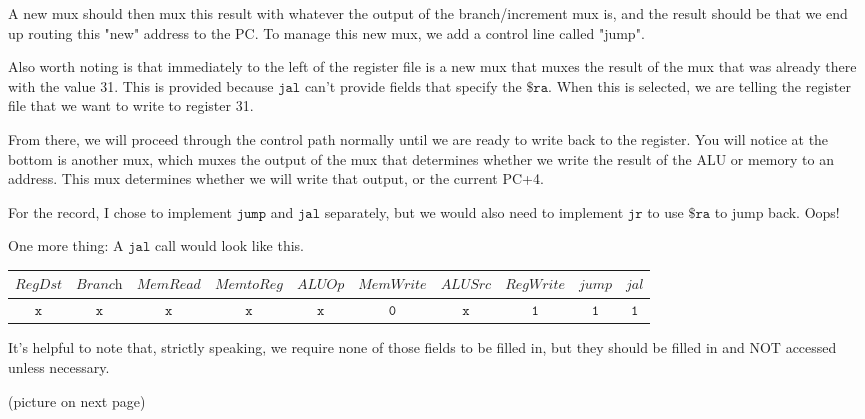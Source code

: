 \documentclass[a4paper]{article}
\begin{document}
A new mux should then mux this result with whatever the output of the branch/increment mux is, and the result should be that we end up routing this "new" address to the PC. To manage this new mux, we add a control line called "jump".

Also worth noting is that immediately to the left of the register file is a new mux that muxes the result of the mux that was already there with the value 31. This is provided because $\texttt{jal}$ can't provide fields that specify the $\texttt{\$ra}$. When this is selected, we are telling the register file that we want to write to register 31.

From there, we will proceed through the control path normally until we are ready to write back to the register. You will notice at the bottom is another mux, which muxes the output of the mux that determines whether we write the result of the ALU or memory to an address. This mux determines whether we will write that output, or the current PC+4.

For the record, I chose to implement $\texttt{jump}$ and $\texttt{jal}$ separately, but we would also need to implement $\texttt{jr}$ to use $\texttt{\$ra}$ to jump back. Oops!

One more thing: A $\texttt{jal}$ call would look like this.

\begin{center}
\begin{tabular}{|c|c|c|c|c|c|c|c|c|c|}
\hline
$\textit{RegDst}$ & $\textit{Branch}$ & $\textit{MemRead}$ & $\textit{MemtoReg}$ & $\textit{ALUOp}$ & $\textit{MemWrite}$ & $\textit{ALUSrc}$ & $\textit{RegWrite}$ & $\textit{jump}$ & $\textit{jal}$ \\
\hline
$\texttt{x}$ & $\texttt{x}$ & $\texttt{x}$ & $\texttt{x}$ & $\texttt{x}$ & $\texttt{0}$ & $\texttt{x}$ & $\texttt{1}$ & $\texttt{1}$ & $\texttt{1}$ \\
\hline
\end{tabular}
\end{center}

It's helpful to note that, strictly speaking, we require none of those fields to be filled in, but they should be filled in and NOT accessed unless necessary.

(picture on next page)
\end{document}
